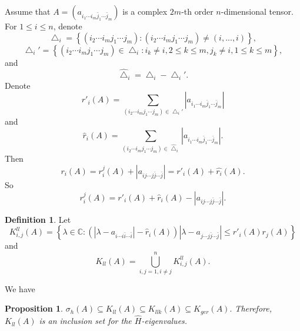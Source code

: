 \documentclass[10pt,reqno]{amsart}
\newtheorem{prop}[thm]{Proposition}
\theoremstyle{definition}
\newtheorem{defn}[thm]{Definition}
\begin{document}
Assume that $A=(a_{i_1\cdots i_{m}\bar{j}_1\cdots \bar{j}_m})$ is a complex $2m$-th order $n$-dimensional tensor.
	For $1\leq i\leq n$, denote
	$$\bigtriangleup_{i}=\left\{(i_{2}\cdots i_{m}j_1\cdots j_m): (i_{2}\cdots i_{m}j_1\cdots j_m)\neq (i,...,i)\right\},$$
	$$\bigtriangleup_{i}'=\left\{(i_{2}\cdots i_{m}j_1\cdots j_m) \in \bigtriangleup_{i} : i_{k}\neq i, 2\leq k\leq m, j_k\neq i, 1\leq k\leq m\right\},$$
and
	$$\hat{\bigtriangleup}_{i}=\bigtriangleup_{i}-\bigtriangleup_{i}'.$$ 
Denote $$r'_{i}(A)=\sum_{(i_{2}\cdots i_{m}j_1\cdots j_m)\in \bigtriangleup_{i}'}|a_{i_1\cdots i_{m}\bar{j}_1\cdots \bar{j}_m}|$$ and $$\hat{r}_{i}(A)=\sum_{(i_{2}\cdots i_{m}j_1\cdots j_m)\in \hat{\bigtriangleup}_{i}}|a_{i_1\cdots i_{m}\bar{j}_1\cdots \bar{j}_m}|.$$ 
	Then $$r_{i}(A)=r_{i}^{j}(A)+|a_{ij\cdots j\bar{j}\cdots\bar{j}}|=r'_{i}(A)+\hat{r_{i}}(A).$$ 
So $$r_{i}^{j}(A)=r'_{i}(A)+\hat{r}_{i}(A)-|a_{ij\cdots j\bar{j}\cdots\bar{j}}|.$$
	\begin{defn} \label{d4.5} Let
$$K_{i,j}^{ll}(A)=\left\{\lambda\in \mathbb C :(|\lambda-a_{i\cdots i\bar{i}\cdots\bar{i}}|-\hat{r}_{i}(A))|\lambda-a_{j\cdots j\bar{j}\cdots\bar{j}}|\leq r'_{i}(A)r_{j}(A)\right\}$$
and $$K_{ll}(A)=\bigcup_{i,j=1,i\neq j}^n K_{i,j}^{ll}(A).$$
\end{defn}
We have
\begin{prop}
	$\sigma_h(A)\subseteq K_{ll}(A)\subseteq K_{llk}(A)\subseteq K_{ger}(A).$ Therefore, $K_{ll}(A)$ is an inclusion set for the $\hat{H}$-eigenvalues.
\end{prop}
\end{document}

